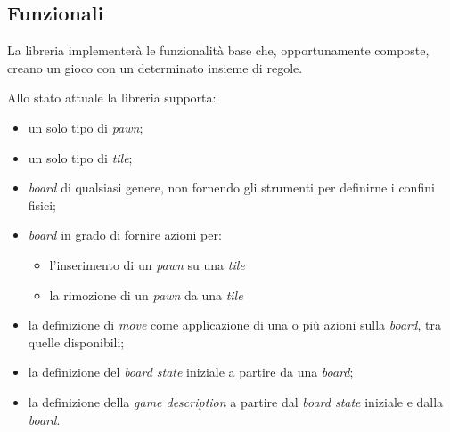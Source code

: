 
\subsection{Funzionali}

La libreria implementerà le funzionalità base che, opportunamente composte, creano un gioco con un determinato insieme di regole.

Allo stato attuale la libreria supporta:

\begin{itemize}
    \item un solo tipo di \textit{pawn};
    \item un solo tipo di \textit{tile};
    \item \textit{board} di qualsiasi genere, non fornendo gli strumenti per definirne i confini fisici;
    \item \textit{board} in grado di fornire azioni per:
    \begin{itemize}
        \item l'inserimento di un \textit{pawn} su una \textit{tile}
        \item la rimozione di un \textit{pawn} da una \textit{tile}
    \end{itemize}
    \item la definizione di \textit{move} come applicazione di una o più azioni sulla \textit{board}, tra quelle disponibili;
    \item la definizione del \textit{board state} iniziale a partire da una \textit{board};
    \item la definizione della \textit{game description} a partire dal \textit{board state} iniziale e dalla \textit{board}.
\end{itemize}

